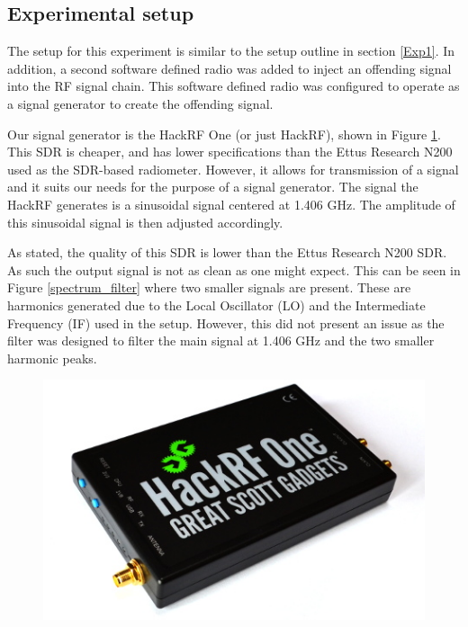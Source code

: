 \subsection{Experimental setup} \label{exp3_setup}

The setup for this experiment is similar to the setup outline in section \ref{Exp1}.  In addition, a second software defined radio was added to inject an offending signal into the RF signal chain.  This software defined radio was configured to operate as a signal generator to create the offending signal.  

Our signal generator is the HackRF One (or just HackRF), shown in Figure \ref{HackRF}.  This SDR is cheaper, and has lower specifications than the Ettus Research N200 used as the SDR-based radiometer.  However, it allows for transmission of a signal and it suits our needs for the purpose of a signal generator.  The signal the HackRF generates is a sinusoidal signal centered at 1.406 GHz.  The amplitude of this sinusoidal signal is then adjusted accordingly. 

As stated, the quality of this SDR is lower than the Ettus Research N200 SDR.  As such the output signal is not as clean as one might expect.  This can be seen in Figure \ref{spectrum_filter} where two smaller signals are present.  These are harmonics generated due to the Local Oscillator (LO) and the Intermediate Frequency (IF) used in the setup.  However, this did not present an issue as the filter was designed to filter the main signal at 1.406 GHz and the two smaller harmonic peaks.

\begin{figure}[h!tb] \centering

\includegraphics[width=12cm]{Images/hackrf.jpg}
\label{HackRF}
\end{figure} 

